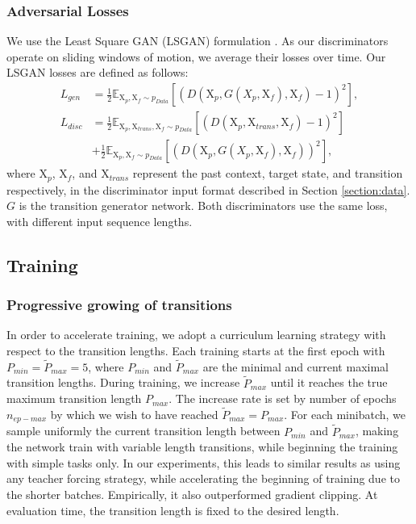 \documentclass[acmtog]{acmart}
\begin{document}
\subsubsection{Adversarial Losses}
We use the Least Square GAN (LSGAN) formulation \cite{mao2017least}. As our discriminators operate on sliding windows of motion, we average their losses over time. Our LSGAN losses are defined as follows:
\begin{align}
     L_{\mathit{gen}} &= \frac{1}{2} \mathbb{E}_{\mathrm{X}_{\mathit{p}}, \mathrm{X}_{\mathit{f}} \sim p_{Data}}[(D({\mathrm{X}}_{\mathit{p}}, G(X_{\mathit{p}}, \mathrm{X}_{\mathit{f}}), {\mathrm{X}}_{\mathit{f}}) - 1)^2], \\
     L_{\mathit{disc}} &= \frac{1}{2} \mathbb{E}_{\mathrm{X}_{\mathit{p}}, \mathrm{X}_{\mathit{trans}}, \mathrm{X}_{\mathit{f}} \sim p_{Data}}[(D({\mathrm{X}}_{\mathit{p}}, \mathrm{X}_{\mathit{trans}}, {\mathrm{X}}_{\mathit{f}}) -1)^2] \nonumber\\
                        &+ \frac{1}{2} \mathbb{E}_{\mathrm{X}_{\mathit{p}}, \mathrm{X}_{\mathit{f}} \sim p_{Data}}[(D({\mathrm{X}}_{\mathit{p}}, G(X_{\mathit{p}}, \mathrm{X}_{\mathit{f}}),{\mathrm{X}}_{\mathit{f}}))^2],
 \end{align}
where $\mathrm{X}_{\mathit{p}}$, $\mathrm{X}_{\mathit{f}}$, and $\mathrm{X}_{\mathit{trans}}$ represent the past context, target state, and transition respectively, in the discriminator input format described in Section \ref{section:data}. $G$ is the transition generator network. Both discriminators use the same loss, with different input sequence lengths. 



\subsection{Training}

\subsubsection{Progressive growing of transitions}
In order to accelerate training, we adopt a curriculum learning strategy with respect to the transition lengths. Each training starts at the first epoch with $P_{\mathit{min}} = \tilde{P}_{\mathit{max}} = 5$, where $P_{\mathit{min}}$ and $\tilde{P}_{\mathit{max}}$ are the minimal and current maximal transition lengths. During training, we increase $\tilde{P}_{\mathit{max}}$ until it reaches the true maximum transition length $P_{\mathit{max}}$. The increase rate is set by number of epochs $n_{\mathit{ep-max}}$ by which we wish to have reached $\tilde{P}_{\mathit{max}} = P_{\mathit{max}}$. For each minibatch, we sample uniformly the current transition length between $P_{\mathit{min}}$ and $\tilde{P}_{\mathit{max}}$, making the network train with variable length transitions, while beginning the training with simple tasks only. In our experiments, this leads to similar results as using any teacher forcing strategy, while accelerating the beginning of training due to the shorter batches. Empirically, it also outperformed gradient clipping. At evaluation time, the transition length is fixed to the desired length.
\end{document}
